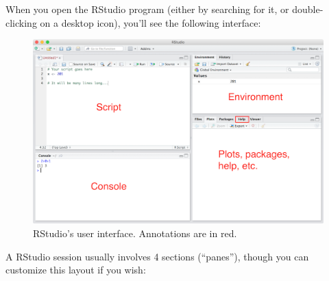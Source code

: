 \documentclass[]{book}
\theoremstyle{definition}
\theoremstyle{definition}
\theoremstyle{remark}
\begin{document}
When you open the RStudio program (either by searching for it, or
double-clicking on a desktop icon), you'll see the following interface:

\begin{figure}
\centering
\includegraphics{img/r-intro/rstudio-interface.png}
\caption{RStudio's user interface. Annotations are in red.}
\end{figure}

A RStudio session usually involves 4 sections (``panes''), though you
can customize this layout if you wish:
\end{document}

